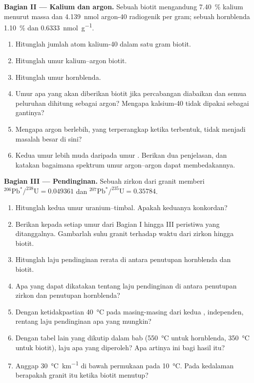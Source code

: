 \begin{problem}
\noindent\textbf{Bagian II --- Kalium dan argon.} Sebuah biotit mengandung \qty{7.40}{\percent} kalium menurut massa dan \qty{4.139}{nmol} argon-40 radiogenik per gram; sebuah hornblenda \qty{1.10}{\percent} dan \qty{0.6333}{nmol.g^{-1}}.
\begin{enumerate}[resume]
  \item Hitunglah jumlah atom kalium-40 dalam satu gram biotit.
  \item Hitunglah umur kalium--argon biotit.
  \item Hitunglah umur hornblenda.
  \item Umur apa yang akan diberikan biotit jika percabangan diabaikan dan semua peluruhan dihitung sebagai argon? Mengapa kalsium-40 tidak dipakai sebagai gantinya?
  \item Mengapa argon berlebih, yang terperangkap ketika  terbentuk, tidak menjadi masalah besar di sini?
  \item Kedua umur lebih muda daripada umur . Berikan dua penjelasan, dan katakan bagaimana spektrum umur argon--argon dapat membedakannya.
\end{enumerate}

\noindent\textbf{Bagian III --- Pendinginan.} Sebuah zirkon dari granit memberi
$^{206}\mathrm{Pb}^*/^{238}\mathrm{U} = 0.049361$ dan
$^{207}\mathrm{Pb}^*/^{235}\mathrm{U} = 0.35784$.
\begin{enumerate}[resume]
  \item Hitunglah kedua umur uranium--timbal. Apakah keduanya konkordan?
  \item Berikan kepada setiap umur dari Bagian I hingga III peristiwa yang ditanggalnya. Gambarlah suhu granit terhadap waktu dari zirkon hingga biotit.
  \item Hitunglah laju pendinginan rerata di antara penutupan hornblenda dan biotit.
  \item Apa yang dapat dikatakan tentang laju pendinginan di antara penutupan zirkon dan penutupan hornblenda?
  \item Dengan ketidakpastian \qty{40}{\celsius} pada masing-masing dari kedua , independen, rentang laju pendinginan apa yang mungkin?
  \item Dengan tabel lain yang dikutip dalam bab (\qty{550}{\celsius} untuk hornblenda, \qty{350}{\celsius} untuk biotit), laju apa yang diperoleh? Apa artinya ini bagi hasil itu?
  \item Anggap  \qty{30}{\celsius.km^{-1}} di bawah permukaan pada \qty{10}{\celsius}. Pada kedalaman berapakah granit itu ketika biotit menutup?
\end{enumerate}


\end{problem}
